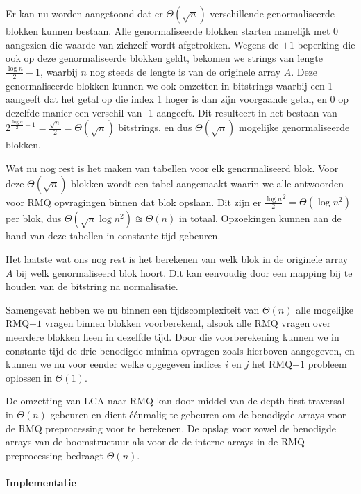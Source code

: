 Er kan nu worden aangetoond dat er $\Theta(\sqrt{n})$ verschillende
genormaliseerde blokken kunnen bestaan. Alle genormaliseerde blokken starten
namelijk met $0$ aangezien die waarde van zichzelf wordt afgetrokken. Wegens de
$\pm1$ beperking die ook op deze genormaliseerde blokken geldt, bekomen we
strings van lengte $\frac{\log{n}}{2} - 1$, waarbij $n$ nog steeds de lengte is
van de originele array $A$. Deze genormaliseerde blokken kunnen we ook omzetten
in bitstrings waarbij een 1 aangeeft dat het getal op die index 1 hoger is dan
zijn voorgaande getal, en 0 op dezelfde manier een verschil van -1 aangeeft. Dit
resulteert in het bestaan van $2^{\frac{\log{n}}{2} - 1} = \frac{\sqrt{n}}{2} =
\Theta(\sqrt{n})$ bitstrings, en dus $\Theta(\sqrt{n})$ mogelijke
genormaliseerde blokken.

Wat nu nog rest is het maken van tabellen voor elk genormaliseerd blok. Voor 
deze
$\Theta(\sqrt{n})$ blokken wordt een tabel aangemaakt waarin we alle antwoorden
voor RMQ opvragingen binnen dat blok opslaan. Dit zijn er $\frac{\log{n}}{2}^2 =
\Theta\left(\log{n}^2\right)$ per blok, dus
$\Theta\left(\sqrt{n}\log{n}^2\right) \approxeq \Theta(n)$ in totaal.
Opzoekingen kunnen aan de hand van deze tabellen in constante tijd gebeuren.

Het laatste wat ons nog rest is het berekenen van welk blok in de originele 
array $A$ bij welk genormaliseerd blok hoort. Dit kan eenvoudig door een 
mapping bij te houden van de bitstring na normalisatie.

Samengevat hebben we nu binnen een tijdscomplexiteit van $\Theta(n)$
alle mogelijke RMQ$\pm1$ vragen binnen blokken voorberekend, alsook alle RMQ
vragen over meerdere blokken heen in dezelfde tijd. Door die voorberekening
kunnen we in constante tijd de drie benodigde minima opvragen zoals hierboven
aangegeven, en kunnen we nu voor eender welke opgegeven indices $i$ en $j$ het
RMQ$\pm1$ probleem oplossen in $\Theta(1)$. 

De omzetting van LCA naar RMQ kan door middel van de depth-first traversal in
$\Theta(n)$ gebeuren en dient éénmalig te gebeuren om de benodigde arrays  voor
de RMQ preprocessing voor te berekenen. De opslag voor zowel de benodigde arrays
van de boomstructuur als voor de de interne arrays in de RMQ preprocessing
bedraagt $\Theta(n)$.

\paragraph{Implementatie} 

